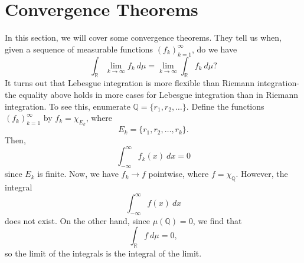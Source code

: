 \documentclass[a4paper, openany]{memoir}
\theoremstyle{definition}
\theoremstyle{plain}
\begin{document}
    \section{Convergence Theorems}
    In this section, we will cover some convergence theorems. They tell us when, given a sequence of measurable functions $(f_k)_{k=1}^\infty$, do we have
    \[\int_{\mathbb{R}}\lim_{k \to \infty} f_k \ d\mu = \lim_{k \to \infty} \int_{\mathbb{R}} f_k \ d\mu?\]
    It turns out that Lebesgue integration is more flexible than Riemann integration- the equality above holds in more cases for Lebesgue integration than in Riemann integration. To see this, enumerate $\mathbb{Q} = \{r_1, r_2, \dots\}$. Define the functions $(f_k)_{k=1}^\infty$ by $f_k = \chi_{E_k}$, where 
    \[E_k = \{r_1, r_2, \dots, r_k\}.\]
    Then, 
    \[\int_{-\infty}^\infty f_k(x) \ dx = 0\]
    since $E_k$ is finite. Now, we have $f_k \to f$ pointwise, where $f = \chi_{\mathbb{Q}}$. However, the integral
    \[\int_{-\infty}^{\infty} f(x) \ dx \]
    does not exist. On the other hand, since $\mu(\mathbb{Q}) = 0$, we find that
    \[\int_{\mathbb{R}} f \ d\mu = 0,\]
    so the limit of the integrals is the integral of the limit.
\end{document}
